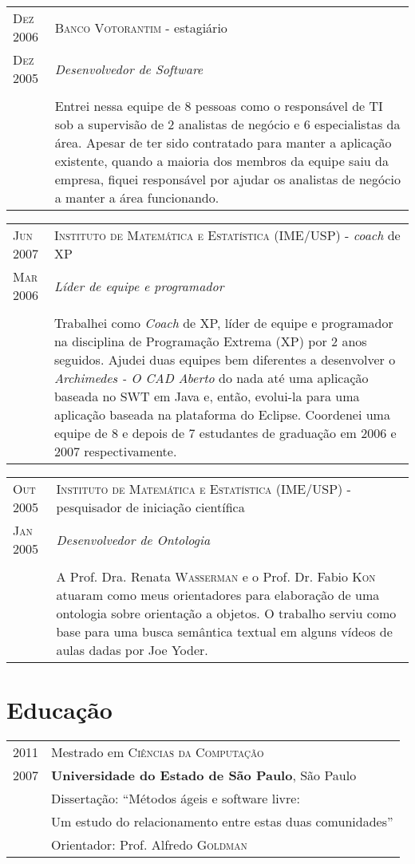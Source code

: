 \documentclass[letter,10pt]{article}
\begin{document}
\begin{tabular}{p{2.5cm}|p{13.5cm}}
  \textsc{Dez 2006} & \textsc{Banco Votorantim} - estagiário\\
  \textsc{Dez 2005} &\emph{Desenvolvedor de Software}\\
  &\\
  &Entrei nessa equipe de 8 pessoas como o responsável de TI sob a
  supervisão de 2 analistas de negócio e 6 especialistas da área. Apesar de
  ter sido contratado para manter a aplicação existente, quando a
  maioria dos membros da equipe saiu da empresa, fiquei responsável
  por ajudar os analistas de negócio a manter a área funcionando.
\end{tabular}

\begin{tabular}{p{2.5cm}|p{13.5cm}}
  \textsc{Jun 2007} & \textsc{Instituto de Matemática e Estatística
    (IME/USP)} - \textit{coach} de XP\\
  \textsc{Mar 2006}& \emph{Líder de equipe e programador}\\
  &\\
  &  Trabalhei como \textit{Coach} de XP, líder de equipe e
  programador na disciplina de Programação Extrema (XP) por 2 anos
  seguidos. Ajudei duas equipes bem diferentes a desenvolver o
  \emph{Archimedes - O CAD Aberto}  do nada até uma aplicação baseada
  no SWT em Java e, então, evolui-la para uma aplicação baseada na
  plataforma do Eclipse. Coordenei uma equipe de 8 e depois de 7
  estudantes de graduação em 2006 e 2007 respectivamente.
\end{tabular}

\begin{tabular}{p{2.5cm}|p{13.5cm}}
  \textsc{Out 2005} & \textsc{Instituto de Matemática e Estatística
    (IME/USP)} - pesquisador de iniciação científica\\
  \textsc{Jan 2005}& \emph{Desenvolvedor de Ontologia}\\
  &\\
  & A Prof. Dra. Renata \textsc{Wasserman} e o Prof. Dr. Fabio
  \textsc{Kon} atuaram como meus orientadores para elaboração de uma
  ontologia sobre orientação a objetos. O trabalho serviu como base
  para uma busca semântica textual em alguns vídeos de aulas dadas por
  Joe Yoder.
\end{tabular}

\section{Educação}
\begin{tabular}{p{2.5cm}l}
  \textsc{2011} & Mestrado em \textsc{Ciências da Computação}\\
  \textsc{2007} & \textbf{Universidade do Estado de São Paulo}, São Paulo\\
  & Dissertação: ``Métodos ágeis e software livre:\\
  & Um estudo do relacionamento entre estas duas comunidades''\\
  & \small Orientador: Prof. Alfredo \textsc{Goldman}\\
\end{tabular}
\end{document}
